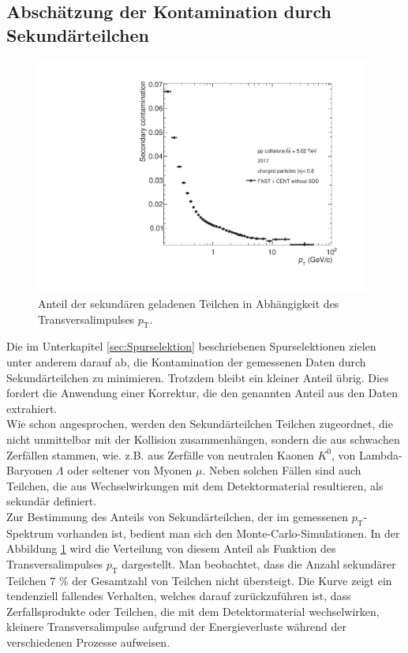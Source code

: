 \documentclass[12pt,a4paper]{report}
\begin{document}
\subsection{Abschätzung der Kontamination durch Sekundärteilchen}
\begin{figure}[H]
\centering
\includegraphics[width=11cm]{Plots/SecCont.pdf}  
\caption{Anteil der sekundären geladenen Teilchen in Abhängigkeit des Transversalimpulses $p_{\mathrm{T}}$.}
\label{SecCont}
\end{figure}
Die im Unterkapitel \ref{sec:Spurselektion} beschriebenen Spurselektionen zielen unter anderem darauf ab, die Kontamination der gemessenen Daten durch Sekundärteilchen zu minimieren. Trotzdem bleibt ein kleiner Anteil übrig. Dies fordert die Anwendung einer Korrektur, die den genannten Anteil aus den Daten extrahiert.\\
Wie schon angesprochen, werden den Sekundärteilchen Teilchen zugeordnet, die nicht unmittelbar mit der Kollision zusammenhängen, sondern die aus schwachen Zerfällen stammen, wie. z.B. aus Zerfälle von neutralen Kaonen $K^{0}$, von Lambda-Baryonen $\Lambda$ oder seltener von Myonen $\mu$. Neben solchen Fällen sind auch Teilchen, die aus Wechselwirkungen mit dem Detektormaterial resultieren, als sekundär definiert.\\
Zur Bestimmung des Anteils von Sekundärteilchen, der im gemessenen $p_{\mathrm{T}}$-Spektrum vorhanden ist, bedient man sich den Monte-Carlo-Simulationen. In der Abbildung \ref{SecCont} wird die Verteilung 
von diesem Anteil als Funktion des Transversalimpulses $p_{\mathrm{T}}$ dargestellt. Man beobachtet, dass die Anzahl sekundärer Teilchen $7$ \% der Gesamtzahl von Teilchen nicht übersteigt. Die Kurve zeigt ein tendenziell fallendes Verhalten, welches darauf zurückzuführen ist, dass Zerfallsprodukte oder Teilchen, die mit dem Detektormaterial wechselwirken, kleinere Transversalimpulse aufgrund der Energieverluste während der verschiedenen Prozesse aufweisen.
\end{document}
